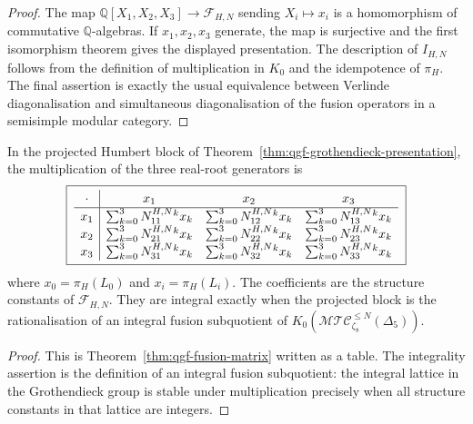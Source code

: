 \begin{proof}
The map \(\mathbb Q[X_1,X_2,X_3]\to\mathcal F_{H,N}\) sending
\(X_i\mapsto x_i\) is a homomorphism of commutative
\(\mathbb Q\)-algebras. If \(x_1,x_2,x_3\) generate, the map is
surjective and the first isomorphism theorem gives the displayed
presentation. The description of \(I_{H,N}\) follows from the
definition of multiplication in \(K_0\) and the idempotence of
\(\pi_H\). The final assertion is exactly the usual equivalence between
Verlinde diagonalisation and simultaneous diagonalisation of the fusion
operators in a semisimple modular category.
\end{proof}

\begin{corollary}
\label{cor:qgf-fusion-table-integer-entries}
In the projected Humbert block of
Theorem~\ref{thm:qgf-grothendieck-presentation}, the multiplication of
the three real-root generators is
\[
\boxed{\;
\renewcommand{\arraystretch}{1.15}
\begin{array}{c|ccc}
 \cdot & x_1 & x_2 & x_3 \\ \hline
 x_1 & \sum_{k=0}^3 N^{H,N}_{11}{}^k x_k
 & \sum_{k=0}^3 N^{H,N}_{12}{}^k x_k
 & \sum_{k=0}^3 N^{H,N}_{13}{}^k x_k \\
 x_2 & \sum_{k=0}^3 N^{H,N}_{21}{}^k x_k
 & \sum_{k=0}^3 N^{H,N}_{22}{}^k x_k
 & \sum_{k=0}^3 N^{H,N}_{23}{}^k x_k \\
 x_3 & \sum_{k=0}^3 N^{H,N}_{31}{}^k x_k
 & \sum_{k=0}^3 N^{H,N}_{32}{}^k x_k
 & \sum_{k=0}^3 N^{H,N}_{33}{}^k x_k
\end{array}\;}
\]
where \(x_0=\pi_H(L_0)\) and \(x_i=\pi_H(L_i)\). The coefficients are
the structure constants of \(\mathcal F_{H,N}\). They are integral
exactly when the projected block is the rationalisation of an integral
fusion subquotient of \(K_0(\mathcal{MTC}_{\zeta_8}^{\leq N}(\Delta_5))\).
\end{corollary}

\begin{proof}
This is Theorem~\ref{thm:qgf-fusion-matrix} written as a table. The
integrality assertion is the definition of an integral fusion
subquotient: the integral lattice in the Grothendieck group is stable
under multiplication precisely when all structure constants in that
lattice are integers.
\end{proof}

